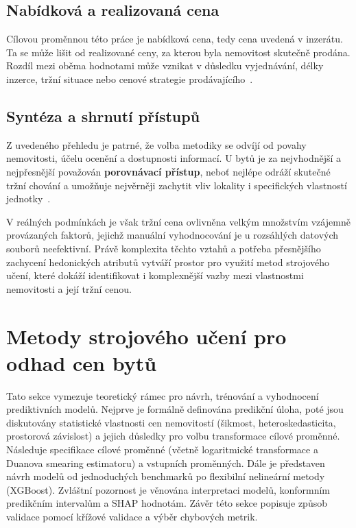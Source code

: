 \subsection{Nabídková a realizovaná cena}
\label{subsec:offer_vs_transaction}

Cílovou proměnnou této práce je nabídková cena, tedy cena uvedená v inzerátu. Ta se může lišit od realizované ceny, za kterou byla nemovitost skutečně prodána. Rozdíl mezi oběma hodnotami může vznikat v důsledku vyjednávání, délky inzerce, tržní situace nebo cenové strategie prodávajícího~\cite{CNB2024RealitniTrh,CaseShiller1989}.

\subsection*{Syntéza a shrnutí přístupů}
Z uvedeného přehledu je patrné, že volba metodiky se odvíjí od povahy nemovitosti, účelu ocenění a dostupnosti informací. U bytů je za nejvhodnější a nejpřesnější považován \textbf{porovnávací přístup}, neboť nejlépe odráží skutečné tržní chování a umožňuje nejvěrněji zachytit vliv lokality i specifických vlastností jednotky~\cite{IVSC2022,CNB2024RealitniTrh}.

V reálných podmínkách je však tržní cena ovlivněna velkým množstvím vzájemně provázaných faktorů, jejichž manuální vyhodnocování je u rozsáhlých datových souborů neefektivní. Právě komplexita těchto vztahů a potřeba přesnějšího zachycení hedonických atributů vytváří prostor pro využití metod strojového učení, které dokáží identifikovat i komplexnější vazby mezi vlastnostmi nemovitosti a její tržní cenou.


\section{Metody strojového učení pro odhad cen bytů}
\label{chap:ml_theory}

Tato sekce vymezuje teoretický rámec pro návrh, trénování a vyhodnocení prediktivních modelů. Nejprve je formálně definována predikční úloha, poté jsou diskutovány statistické vlastnosti cen nemovitostí (šikmost, heteroskedasticita, prostorová závislost) a jejich důsledky pro volbu transformace cílové proměnné. Následuje specifikace cílové proměnné (včetně logaritmické transformace a Duanova smearing estimatoru) a vstupních proměnných. Dále je představen návrh modelů od jednoduchých benchmarků po flexibilní nelineární metody (XGBoost). Zvláštní pozornost je věnována interpretaci modelů, konformním predikčním intervalům a SHAP hodnotám. Závěr této sekce popisuje způsob validace pomocí křížové validace a výběr chybových metrik.

